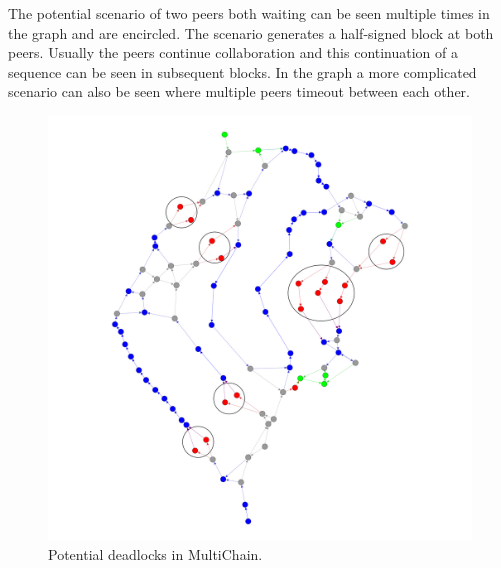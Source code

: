 The potential scenario of two peers both waiting can be seen multiple times in the graph and are encircled.
The scenario generates a half-signed block at both peers.
Usually the peers continue collaboration and this continuation of a sequence can be seen in subsequent blocks.
In the graph a more complicated scenario can also be seen where multiple peers timeout between each other.

\begin{figure}
	\centerline{\includegraphics[scale=0.0375]{experimentation/deadlock/deadlock.png}}
	\caption{Potential deadlocks in MultiChain.}
	\label{fig:deadlock-double}
\end{figure}